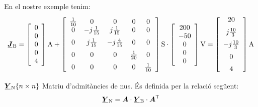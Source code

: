 \begin{list}{}
   En el nostre exemple tenim:
   \[
      \mcmplx{J}\ped{B} =
      \begin{bmatrix}\begin{array}{c} 
      	0 \\ 0 \\ 0 \\ 0 \\ 4 
      \end{array}\end{bmatrix}\unit{A} +
      \begin{bmatrix}\begin{array}{ccccc} 
            \frac{1}{10} & 0 & 0 & 0 & 0 \\
            0 & -j\frac{1}{15} & j\frac{1}{15} & 0 & 0 \\[2mm]
            0 & j\frac{1}{15} & -j\frac{4}{15} & 0 & 0 \\[2mm]
            0 & 0 & 0 & \frac{1}{20} & 0 \\[2mm]
            0 & 0 & 0 & 0 & \frac{1}{10}
      \end{array}\end{bmatrix}\unit{S} \cdot
      \begin{bmatrix}\begin{array}{c}  
      	200 \\ -50 \\ 0 \\ 0 \\ 0 
      \end{array}\end{bmatrix}\unit{V} =
      \begin{bmatrix}\begin{array}{c} 
            20 \\[2mm]
             j \frac{10}{3} \\[2mm]
             -j \frac{10}{3} \\[2mm]
             0 \\[2mm]
              4
      \end{array}\end{bmatrix}\unit{A}
   \]

   \item[$\mcmplx{Y}\ped{N}\{n\times n\}$] Matriu d'admitàncies de nus. És definida per la relació següent:
   \begin{equation}
      \mcmplx{Y}\ped{N} = \boldsymbol{A} \cdot \mcmplx{Y}\ped{B} \cdot
      \transpose{\boldsymbol{A}}
   \end{equation}


\end{list}
